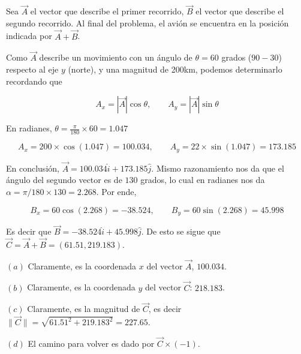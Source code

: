 \documentclass[12pt]{article}
\theoremstyle{definition}
\begin{document}
Sea $\vec{A}$ el vector que describe el primer recorrido, $\vec{B}$ el
vector que describe el segundo recorrido. Al final del problema, el avión se
encuentra en la posición indicada por $\vec{A} + \vec{B}$. 

Como $\vec{A}$ describe un movimiento con un ángulo de $\theta = 60$ grados
($90 - 30$) respecto al eje $y$ (norte), y una magnitud de 200km, podemos
determinarlo recordando que

\begin{equation*}
     A_x = \left| \vec{A} \right| \cos \theta, \qquad A_y = \left| \vec{A}
     \right| \sin \theta
\end{equation*}

En radianes, $\theta = \frac{\pi}{180} \times 60 = 1.047$

\begin{equation*}
    A_x = 200 \times \cos \left( 1.047 \right) = 100.034, \qquad A_y = 22 \times
    \sin(1.047) = 173.185
\end{equation*}

En conclusión, $\vec{A} = 100.034 \hat{i} + 173.185 \hat{j}$. Mismo razonamiento
nos da que el ángulo del segundo vector es de $130$ grados, lo cual en radianes
nos da $\alpha = \pi / 180 \times 130 = 2.268$. Por ende, 

\begin{equation*}
    B_x = 60 \cos(2.268) = -38.524, \qquad B_y = 60  \sin(2.268) = 45.998
\end{equation*}

Es decir que $\vec{B} = -38.524 \hat{i} + 45.998 \hat{j}$. De esto se sigue 
que $\vec{C} = \vec{A} + \vec{B} = (61.51, 219.183)$. 

$(a)$ Claramente, es la coordenada $x$ del vector $\vec{A}$, $100.034$.

$(b)$ Claramente, es la coordenada $y$ del vector $\vec{C}$: $218.183$. 

$(c)$ Claramente, es la magnitud de $\vec{C}$, es decir $\|\vec{C}\| =
\sqrt{61.51^2 + 219.183^2} = 227.65$.

$(d)$ El camino para volver es dado por $\vec{C} \times (-1)$.

















\pagebreak
\end{document}
